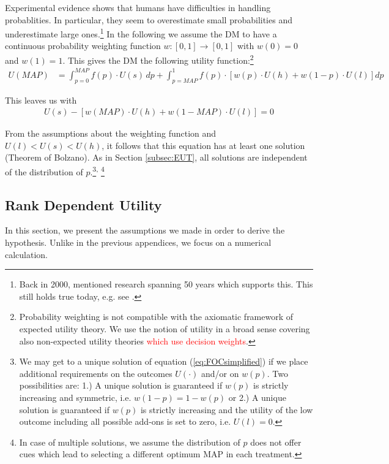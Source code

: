 Experimental evidence shows that humans have difficulties in handling probablities.
In particular, they seem to overestimate small probabilities and underestimate large ones.\footnote{
Back in 2000, \citet[p.~348--349]{Starmer2000} mentioned research spanning 50 years which supports this.
This still holds true today, e.g. see \citet[Figure 4 on p.~276]{Li2020a}.  
} 
In the following we assume the DM to have a continuous probability weighting function $w: [0,1] \rightarrow [0,1]$ with $w(0) = 0$ and $w(1) = 1$.
This gives the DM the following utility function:\footnote{
Probability weighting is not compatible with the axiomatic framework of expected utility theory.
We use the notion of utility in a broad sense covering also non-expected utility theories \textcolor{red}{which use decision weights}.
}
\begin{align}
	U(MAP) &= \int_{p=0}^{MAP} f(p) \cdot U(s) \, dp %
	+ \int_{p=MAP}^1 f(p) \cdot \left[w(p) \cdot U(h) + w(1-p) \cdot U(l) \right] dp
\end{align}

This leaves us with 
\begin{align}
	\label{eq:FOCsimplified}
	U(s) - \left[w(MAP) \cdot U(h) + w(1-MAP) \cdot U(l) \right] = 0 
\end{align}

From the assumptions about the weighting function and $U(l)<U(s)<U(h)$, it follows that this equation has at least one solution (Theorem of Bolzano).
As in Section \ref{subsec:EUT}, all solutions are independent of the distribution of $p$.\footnote{
We may get to a unique solution of equation (\ref{eq:FOCsimplified}) if we place additional requirements on the outcomes $U(\cdot)$ and/or on $w(p)$.
Two possibilities are:
1.) A unique solution is guaranteed if $w(p)$ is strictly increasing and symmetric, i.e. $w(1-p) = 1-w(p)$ or
2.) A unique solution is guaranteed if $w(p)$ is strictly increasing and the utility of the low outcome including all possible add-ons is set to zero, i.e. $U(l) = 0$.
}\textsuperscript{,} 
\footnote{
In case of multiple solutions, we assume the distribution of $p$ does not offer cues which lead to selecting a different optimum MAP in each treatment.
}
	


\subsection{Rank Dependent Utility}
\label{subsec:RDU}
In this section, we present the assumptions we made in order to derive the hypothesis.
Unlike in the previous appendices, we focus on a numerical calculation.

